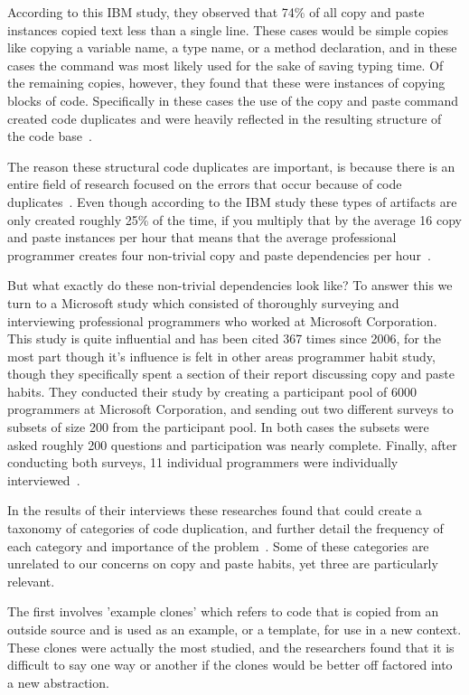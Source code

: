 \documentclass{acm_proc_article-sp}
\begin{document}
According to this IBM study, they observed that 74\% of all copy and paste instances copied text less than a single line. These cases would be simple copies like copying a variable name, a type name, or a method declaration, and in these cases the command was most likely used for the sake of saving typing time. Of the remaining copies, however, they found that these were instances of copying blocks of code. Specifically in these cases the use of the copy and paste command created code duplicates and were heavily reflected in the resulting structure of the code base~\cite{ooplCP}.

The reason these structural code duplicates are important, is because there is an entire field of research focused on the errors that occur because of code duplicates~\cite{devWorkHabits}. Even though according to the IBM study these types of artifacts are only created roughly 25\% of the time, if you multiply that by the average 16 copy and paste instances per hour that means that the average professional programmer creates four non-trivial copy and paste dependencies per hour~\cite{ooplCP}. 

But what exactly do these non-trivial dependencies look like? To answer this we turn to a Microsoft study which consisted of thoroughly surveying and interviewing professional programmers who worked at Microsoft Corporation. This study is quite influential and has been cited 367 times since 2006, for the most part though it's influence is felt in other areas programmer habit study, though they specifically spent a section of their report discussing copy and paste habits. They conducted their study by creating a participant pool of 6000 programmers at Microsoft Corporation, and sending out two different surveys to subsets of size 200 from the participant pool. In both cases the subsets were asked roughly 200 questions and participation was nearly complete. Finally, after conducting both surveys, 11 individual programmers were individually interviewed~\cite{devWorkHabits}. 

In the results of their interviews these researches found that could create a taxonomy of categories of code duplication, and further detail the frequency of each category and importance of the problem~\cite{devWorkHabits}. Some of these categories are unrelated to our concerns on copy and paste habits, yet three are particularly relevant.

The first involves 'example clones' which refers to code that is copied from an outside source and is used as an example, or a template, for use in a new context. These clones were actually the most studied, and the researchers found that it is difficult to say one way or another if the clones would be better off factored into a new abstraction. 
\end{document}
